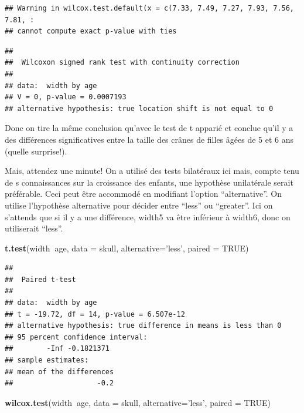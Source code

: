 \documentclass[12pt,]{book}
\newenvironment{Shaded}{\begin{snugshade}}{\end{snugshade}}
\newcommand{\DataTypeTok}[1]{\textcolor[rgb]{0.27,0.27,0.27}{#1}}
\newcommand{\KeywordTok}[1]{\textcolor[rgb]{0.27,0.27,0.27}{\textbf{#1}}}
\newcommand{\NormalTok}[1]{#1}
\newcommand{\OperatorTok}[1]{\textcolor[rgb]{0.43,0.43,0.43}{\textbf{#1}}}
\newcommand{\OtherTok}[1]{\textcolor[rgb]{0.37,0.37,0.37}{#1}}
\newcommand{\StringTok}[1]{\textcolor[rgb]{0.5,0.5,0.5}{#1}}
\begin{document}
\begin{verbatim}
## Warning in wilcox.test.default(x = c(7.33, 7.49, 7.27, 7.93, 7.56, 7.81, :
## cannot compute exact p-value with ties
\end{verbatim}

\begin{verbatim}
## 
## 	Wilcoxon signed rank test with continuity correction
## 
## data:  width by age
## V = 0, p-value = 0.0007193
## alternative hypothesis: true location shift is not equal to 0
\end{verbatim}

Donc on tire la même conclusion qu'avec le test de t apparié et conclue qu'il y a des différences significatives entre la taille des crânes de filles âgées de 5 et 6 ans (quelle surprise!).

Mais, attendez une minute! On a utilisé des tests bilatéraux ici mais, compte tenu de s connaissances sur la croissance des enfants, une hypothèse unilatérale serait préférable. Ceci peut être accommodé en modifiant l'option ``alternative''. On utilise l'hypothèse alternative pour décider entre ``less'' ou ``greater''. Ici on s'attends que si il y a une différence, width5 va être inférieur à width6, donc on utiliserait ``less''.

\begin{Shaded}
\begin{Highlighting}[]
\KeywordTok{t.test}\NormalTok{(width}\OperatorTok{~}\NormalTok{age, }\DataTypeTok{data =}\NormalTok{ skull,}
  \DataTypeTok{alternative=}\StringTok{'less'}\NormalTok{,}
  \DataTypeTok{paired =} \OtherTok{TRUE}\NormalTok{)}
\end{Highlighting}
\end{Shaded}

\begin{verbatim}
## 
## 	Paired t-test
## 
## data:  width by age
## t = -19.72, df = 14, p-value = 6.507e-12
## alternative hypothesis: true difference in means is less than 0
## 95 percent confidence interval:
##        -Inf -0.1821371
## sample estimates:
## mean of the differences 
##                    -0.2
\end{verbatim}

\begin{Shaded}
\begin{Highlighting}[]
\KeywordTok{wilcox.test}\NormalTok{(width}\OperatorTok{~}\NormalTok{age, }\DataTypeTok{data =}\NormalTok{ skull,}
  \DataTypeTok{alternative=}\StringTok{'less'}\NormalTok{,}
  \DataTypeTok{paired =} \OtherTok{TRUE}\NormalTok{)}
\end{Highlighting}
\end{Shaded}
\end{document}
